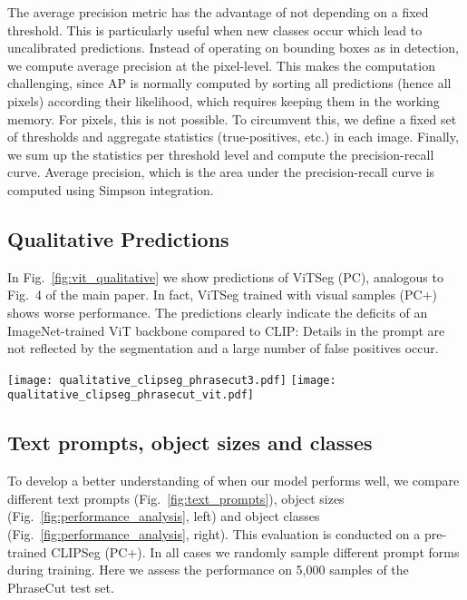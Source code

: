 \documentclass[10pt,twocolumn,letterpaper]{article}
\begin{document}
The average precision metric has the advantage of not depending on a fixed threshold. This is particularly useful when new classes occur which lead to uncalibrated predictions. 
Instead of operating on bounding boxes as in detection, we compute average precision at the pixel-level. This makes the computation challenging, since AP is normally computed by sorting all predictions (hence all pixels) according their likelihood, which requires keeping them in the working memory. For pixels, this is not possible.
To circumvent this, we define a fixed set of thresholds and aggregate statistics (true-positives, etc.) in each image. Finally, we sum up the statistics per threshold level and compute the precision-recall curve. Average precision, which is the area under the precision-recall curve is computed using Simpson integration.







\subsection*{Qualitative Predictions}

In Fig.~\ref{fig:vit_qualitative} we show predictions of ViTSeg (PC), analogous to Fig.~4 of the main paper. In fact, ViTSeg trained with visual samples (PC+) shows worse performance. 
The predictions clearly indicate the deficits of an ImageNet-trained ViT backbone compared to CLIP: Details in the prompt are not reflected by the segmentation and a large number of false positives occur. 

\begin{figure*}
    \centering
    \texttt{[image: qualitative\_clipseg\_phrasecut3.pdf]}
    \texttt{[image: qualitative\_clipseg\_phrasecut\_vit.pdf]}
    \caption{Qualitative predictions of CLIPSeg (PC+) (top, same as Fig.~4 of main paper for reference) and ViTSeg (PC) (bottom).}
    \label{fig:vit_qualitative}
\end{figure*}


\subsection*{Text prompts, object sizes and classes}

To develop a better understanding of when our model performs well, we compare different text prompts (Fig.~\ref{fig:text_prompts}), object sizes (Fig.~\ref{fig:performance_analysis}, left) and object classes (Fig.~\ref{fig:performance_analysis}, right). This evaluation is conducted on a pre-trained  CLIPSeg (PC+). In all cases we randomly sample different prompt forms during training. 
Here we assess the performance on 5,000 samples of the PhraseCut test set.
\end{document}
